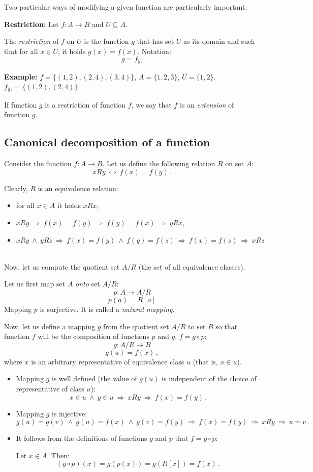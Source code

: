 \documentclass[11pt,paper=b5,footinclude,headinclude]{scrbook} %
\def\inn {{~\wedge~}}
\def\sledi {{~\Rightarrow~}}
\def\cee {{~\Leftrightarrow~}}
\theoremstyle{remark}
\theoremstyle{definition} %
\theoremstyle{theorem} %
\begin{document}
Two particular ways of modifying a given function are particularly important:

\textbf{ Restriction:}
Let $f:A\to B$ and $U\subseteq A$.

The {\em restriction} of $f$ on  $U$
is the function $g$ that has set $U$ as its domain and such that for all $x\in U$, it holds
$g(x) = f(x)$. Notation:
$$g = f_{|U}$$

\bigskip
\textbf{ Example:} $f = \{(1,2),(2,4),(3,4)\}$, $A = \{1,2,3\}$, $U =  \{1,2\}$.
$f_{|U} = \{(1,2),(2,4)\}$

\bigskip
If function $g$ is a restriction of function $f$, we say that $f$ is an {\em extension} of function $g$.

\subsection{Canonical decomposition of a function}
Consider the function $f:A{\to} B$.
Let us define the following relation $R$ on set $A$:
$$xRy \cee f(x) = f(y)\,.$$

Clearly, $R$ is an equivalence relation:
\begin{itemize}
  \item for all $x\in A$ it holds $xRx$,
  \item $xRy \sledi f(x) = f(y) \sledi f(y) = f(x) \sledi yRx$,
  \item $xRy \inn yRz \sledi f(x) = f(y) \inn f(y) = f(z) \sledi f(x) = f(z) \sledi xRz$.
\end{itemize}
Now, let us compute the quotient set $A/R$ (the set of all equivalence classes).

Let us first map set $A$ {\em onto} set $A/R$:
$$p:A{\to} A/R$$
$$p(a) = R[a]$$
Mapping $p$ is surjective. It is called a {\em natural mapping}.

Now, let us define a mapping $g$ from  the quotient set $A/R$ to set $B$ so that
function $f$ will be the composition of functions $p$ and $g$, $f = g\circ p$:
$$g:A/R{\to} B$$
$$g(u) = f(x)\,,$$
where $x$ is an arbitrary representative of equivalence class $u$ (that is, $x\in u$).

\begin{itemize}
  \item Mapping  $g$ is well defined (the value of $g(u)$ is independent of the choice of representative of class $u$):
$$x\in u\inn y\in u \sledi xRy \sledi f(x) = f(y)\,.$$
  \item Mapping $g$ is injective:
$$g(u) = g(v) \inn g(u) = f(x) \inn g(v) = f(y) \sledi f(x) = f(y) \sledi xRy \sledi  u = v\,.$$
  \item It follows from the definitions of functions $g$ and $p$ that  $f = g\circ p$:

Let $x\in A$. Then:
$$(g\circ p)(x) = g(p(x)) = g(R[x]) = f(x)\,.$$
\end{itemize}
\end{document}

